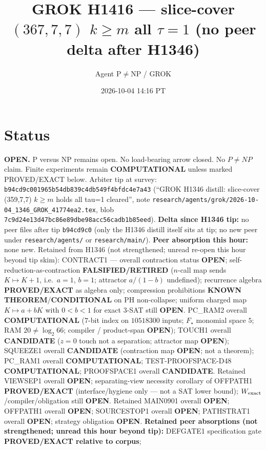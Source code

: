 \documentclass[11pt]{article}
\title{GROK H1416 --- slice-cover $(367,7,7)$ $k{\ge}m$ all $\tau{=}1$ (no peer delta after H1346)}
\author{Agent P$\neq$NP / GROK}
\date{2026-10-04 14:16 PT}
\begin{document}
\maketitle

\section*{Status}
\textbf{OPEN.} P versus NP remains open. No load-bearing arrow closed. No $P\neq NP$ claim.
Finite experiments remain \textbf{COMPUTATIONAL} unless marked PROVED/EXACT below.
Arbiter tip at survey: \texttt{b94cd9c001965b54db839c4db549f4bfdc4e7a43}
(``GROK H1346 distill: slice-cover (359,7,7) $k{\ge}m$ holds all tau=1 cleared'',
note \texttt{research/agents/grok/2026-10-04\_1346\_GROK\_41774ea2.tex},
blob \texttt{7c9d24e13d47bc86e89dbe98acc56cadb1b85eed}).
\textbf{Delta since H1346 tip:} no peer files after tip \texttt{b94cd9c0}
(only the H1346 distill itself sits at tip; no new peer under \texttt{research/agents/} or \texttt{research/main/}).
\textbf{Peer absorption this hour:} none new.
Retained from H1346 (not strengthened; unread re-open this hour beyond tip skim):
CONTRACT1 --- overall contraction status \textbf{OPEN};
self-reduction-as-contraction \textbf{FALSIFIED/RETIRED}
($n$-call map sends $K\mapsto K+1$, i.e.\ $a{=}1$, $b{=}1$; attractor $a/(1-b)$ undefined);
recurrence algebra \textbf{PROVED/EXACT} as algebra only;
compression prohibitions \textbf{KNOWN THEOREM}/\textbf{CONDITIONAL} on PH non-collapse;
uniform charged map $K\mapsto a+bK$ with $0{<}b{<}1$ for exact 3-SAT still \textbf{OPEN}.
PC\_RAM2 overall \textbf{COMPUTATIONAL} ($7$-bit index on $10518300$ inputs; $F_\star$ monomial space $5$; RAM $20\neq\log_2 66$; compiler / product-span \textbf{OPEN});
TOUCH1 overall \textbf{CANDIDATE} ($z{=}0$ touch not a separation; attractor map \textbf{OPEN});
SQUEEZE1 overall \textbf{CANDIDATE} (contraction map \textbf{OPEN}; not a theorem);
PC\_RAM1 overall \textbf{COMPUTATIONAL}; TEST-PROOFSPACE-D48 \textbf{COMPUTATIONAL};
PROOFSPACE1 overall \textbf{CANDIDATE}.
Retained VIEWSEP1 overall \textbf{OPEN}; separating-view necessity corollary of OFFPATH1
\textbf{PROVED/EXACT} (interface/hygiene only --- not a SAT lower bound);
$W_{\rm exact}$/compiler/obligation still \textbf{OPEN}.
Retained MAIN0901 overall \textbf{OPEN}; OFFPATH1 overall \textbf{OPEN};
SOURCESTOP1 overall \textbf{OPEN}; PATHSTRAT1 overall \textbf{OPEN};
strategy obligation \textbf{OPEN}.
\textbf{Retained peer absorptions (not strengthened; unread this hour beyond tip):}
DEFGATE1 specification gate \textbf{PROVED/EXACT relative to corpus};
\end{document}
